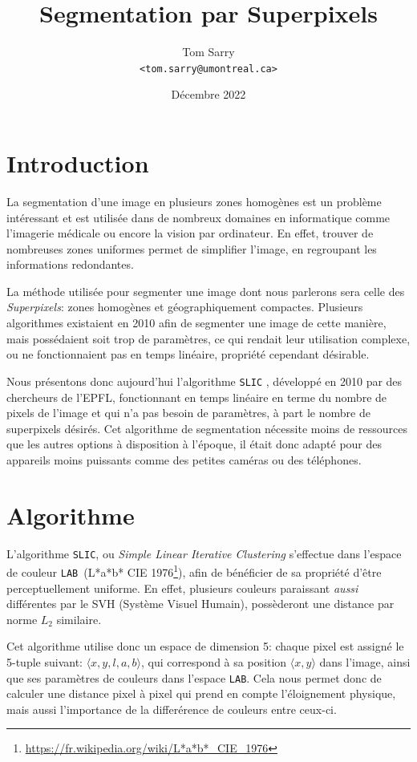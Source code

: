 \documentclass[12pt]{article}
\title{\vspace{-1cm} Segmentation par Superpixels}
\author{
  Tom Sarry \\
  \texttt{<tom.sarry@umontreal.ca>}
}
\date{D\'ecembre 2022}
\newcommand{\lab}{\texttt{LAB}}
\begin{document}
\maketitle

\section{Introduction}

La segmentation d'une image en plusieurs zones homog\`enes est un probl\`eme int\'eressant
et est utilis\'ee dans de nombreux domaines en informatique comme l'imagerie m\'edicale ou encore la vision par ordinateur.
En effet, trouver de nombreuses zones uniformes permet de simplifier l'image, en regroupant les informations redondantes.

La m\'ethode utilis\'ee pour segmenter une image dont nous parlerons sera celle des \textit{Superpixels}:
zones homog\`enes et g\'eographiquement compactes.
Plusieurs algorithmes existaient en 2010 afin de segmenter une image de cette mani\`ere, mais poss\'edaient soit
trop de param\`etres, ce qui rendait leur utilisation complexe, ou ne fonctionnaient pas en temps lin\'eaire, propri\'et\'e cependant d\'esirable.

Nous pr\'esentons donc aujourd'hui l'algorithme \texttt{SLIC} \cite*{slic}, d\'evelopp\'e en 2010 par des chercheurs de l'EPFL,
fonctionnant en temps lin\'eaire en terme du nombre de pixels de l'image
et qui n'a pas besoin de param\`etres, \`a part le nombre de superpixels d\'esir\'es.
Cet algorithme de segmentation n\'ecessite moins de ressources que les autres options \`a disposition \`a l'\'epoque,
il \'etait donc adapt\'e pour des appareils moins puissants comme des petites cam\'eras ou des t\'el\'ephones.

\section{Algorithme}

L'algorithme \texttt{SLIC}, ou \textit{Simple Linear Iterative Clustering} s'effectue dans l'espace
de couleur \lab\ (L*a*b* CIE 1976\footnote{\url{https://fr.wikipedia.org/wiki/L*a*b*_CIE_1976}}),
afin de b\'en\'eficier de sa propri\'et\'e d'\^etre perceptuellement uniforme.
En effet, plusieurs couleurs paraissant \textit{aussi} diff\'erentes par le SVH (Syst\`eme Visuel Humain),
poss\`ederont une distance par norme $L_2$ similaire.

Cet algorithme utilise donc un espace de dimension 5: chaque pixel est assign\'e le 5-tuple suivant: $\langle x, y, l, a, b \rangle$,
qui correspond \`a sa position $\langle x, y\rangle$ dans l'image, ainsi que ses param\`etres de couleurs dans l'espace \lab.
Cela nous permet donc de calculer une distance pixel \`a pixel qui prend en compte l'\'eloignement physique,
mais aussi l'importance de la differ\'erence de couleurs entre ceux-ci.
\end{document}
